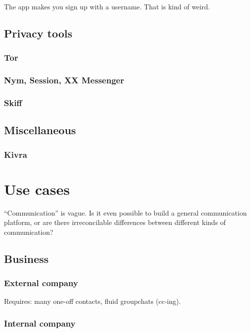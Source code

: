\documentclass[sigconf, nonacm, balance=false, natbib=false]{acmart}
\begin{document}
The app makes you sign up with a username. That is kind of weird.

\subsection{Privacy tools}

\subsubsection{Tor}

\subsubsection{Nym, Session, XX Messenger}

\subsubsection{Skiff}

\subsection{Miscellaneous}

\subsubsection{Kivra}

\section{Use cases}

``Communication'' is vague. Is it even possible to build a general communication platform, or are there irreconcilable differences between different kinds of communication?

\subsection{Business}

\subsubsection{External company}

Requires: many one-off contacts, fluid groupchats (cc-ing).

\subsubsection{Internal company}
\end{document}
